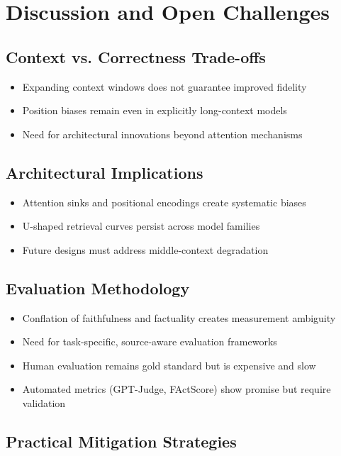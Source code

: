 \documentclass[11pt,letterpaper]{article}
\begin{document}
\section{Discussion and Open Challenges}

\subsection{Context vs. Correctness Trade-offs}

\begin{itemize}[leftmargin=*]
\item Expanding context windows does not guarantee improved fidelity
\item Position biases remain even in explicitly long-context models
\item Need for architectural innovations beyond attention mechanisms
\end{itemize}

\subsection{Architectural Implications}

\begin{itemize}[leftmargin=*]
\item Attention sinks and positional encodings create systematic biases
\item U-shaped retrieval curves persist across model families
\item Future designs must address middle-context degradation
\end{itemize}

\subsection{Evaluation Methodology}

\begin{itemize}[leftmargin=*]
\item Conflation of faithfulness and factuality creates measurement ambiguity
\item Need for task-specific, source-aware evaluation frameworks
\item Human evaluation remains gold standard but is expensive and slow
\item Automated metrics (GPT-Judge, FActScore) show promise but require validation
\end{itemize}

\subsection{Practical Mitigation Strategies}
\end{document}

